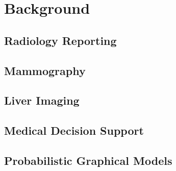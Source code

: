 \chapter{Background}

\section{Radiology Reporting}

\section{Mammography}

\section{Liver Imaging}

\section{Medical Decision Support}

\section{Probabilistic Graphical Models}